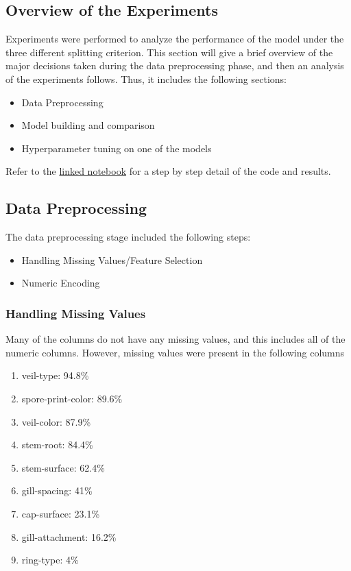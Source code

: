 \documentclass{article}
\begin{document}
\subsection{Overview of the Experiments}

Experiments were performed to analyze the performance of the model under the three different splitting criterion.
This section will give a brief overview of the major decisions taken during the data preprocessing phase, and then an analysis of the experiments follows. Thus, it includes the following sections:
\begin{itemize}
    \item Data Preprocessing
    \item Model building and comparison
    \item Hyperparameter tuning on one of the models
\end{itemize}
Refer to the \href{https://github.com/Mubarakbabs/unimi-dse-ml-final-project/blob/main/Mushroom%20Analysis.ipynb}{linked notebook} for a step by step detail of the code and results.

\subsection{Data Preprocessing}

The data preprocessing stage included the following steps:
\begin{itemize}
    \item Handling Missing Values/Feature Selection
    \item Numeric Encoding
\end{itemize}


\subsubsection{Handling Missing Values}
Many of the columns do not have any missing values, and this includes all of the numeric columns. However, missing values were present in the following columns

\begin{enumerate}
    \item veil-type: 94.8\%
    \item spore-print-color: 89.6\%
    \item veil-color: 87.9\%
    \item stem-root: 84.4\%
    \item stem-surface: 62.4\%
    \item gill-spacing: 41\%
    \item cap-surface: 23.1\%
    \item gill-attachment: 16.2\%
    \item ring-type: 4\%
\end{enumerate}
\end{document}
